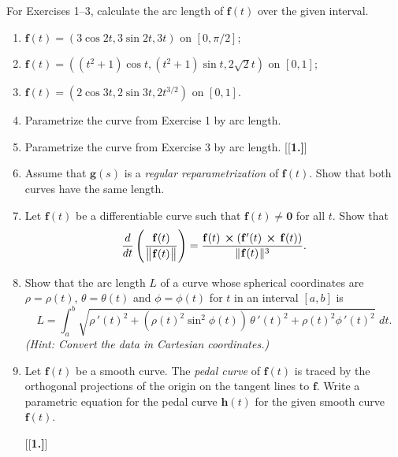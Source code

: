 \startexercises\label{sec1dot9}
\par\noindent For Exercises 1--3, calculate the arc length of $\mathbf{f}(t)$ over the given interval.
\begin{enumerate}[\bfseries 1.]
 \item $\mathbf{f}(t) = (3\cos 2t, 3\sin 2t, 3t)$ on $[0,\pi/2]$;
 \item $\mathbf{f}(t) = ((t^2 + 1)\cos t, (t^2 + 1)\sin t, 2\sqrt{2} t)$ on $[0,1]$;
 \item $\mathbf{f}(t) = (2\cos 3t, 2\sin 3t, 2t^{3/2})$ on $[0,1]$.
 \item Parametrize the curve from Exercise 1 by arc length.
 \item Parametrize the curve from Exercise 3 by arc length. 
[{[\bfseries 1.]}]
 \item Assume that $\mathbf{g}(s)$ is a \emph{regular reparametrization} of $\mathbf{f}(t)$. 
 Show that both curves have the same length.
 \item Let $\mathbf{f}(t)$ be a differentiable curve such that $\mathbf{f}(t) \ne \mathbf{0}$ for all $t$. Show that
  \begin{displaymath}
   \frac{d}{dt} \left( \dfrac{\mathbf{f}(t)}{\bigl\lVert\mspace{1mu}\mathbf{f}(t)\mspace{1mu}\bigr\rVert} \right) =
    \dfrac{\mathbf{f}(t)\, \bm{\times} (\mathbf{f}'(t)\, \bm{\times} \,\mathbf{f}(t))}{\lVert\mspace{1mu}\mathbf{f}(t)\mspace{1mu}\rVert^3} .
  \end{displaymath}

 \item Show that the arc length $L$ of a curve whose spherical coordinates are $\rho = \rho(t)$, $\theta = \theta(t)$
  and $\phi = \phi(t)$ for $t$ in an interval $[a,b]$ is
  \begin{displaymath}
   L = \int_{a}^{b} \sqrt{\rho\,'(t)^2 + (\rho(t)^2 \sin^2 \phi(t))\,\theta\,'(t)^2 + \rho(t)^2 \phi\,'(t)^2}\,\, dt .
  \end{displaymath}
  \emph{(Hint: Convert the data in Cartesian coordinates.)}
  
  \item Let $\mathbf{f}(t)$ be a smooth curve. 
  The \emph{pedal curve} of $\mathbf{f}(t)$ is traced by the orthogonal projections of the origin on the tangent lines to $\mathbf{f}$. Write a parametric equation for the pedal curve $\mathbf{h}(t)$ for the given smooth curve $\mathbf{f}(t)$.
  
[{[\bfseries 1.]}]
  

\end{enumerate}

